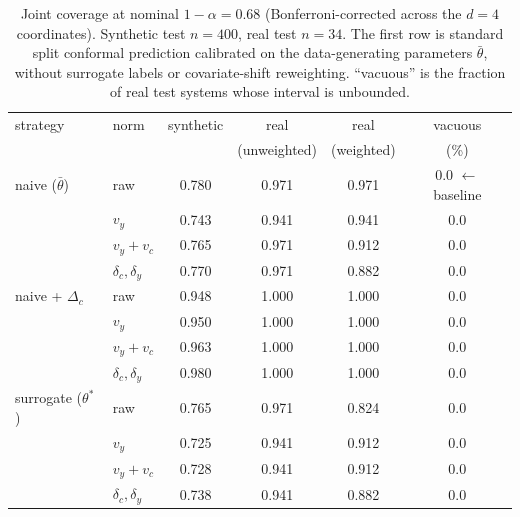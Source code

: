 \begin{table}[t]
\centering
\small
\begin{tabular}{llcccc}
\toprule
strategy & norm & synthetic & real & real & vacuous \\
         &      &           & (unweighted) & (weighted) & (\%) \\
\midrule
naive ($\bar\theta$) & raw & 0.780 & 0.971 & 0.971 & 0.0  \quad$\leftarrow$ baseline \\
 & $v_y$ & 0.743 & 0.941 & 0.941 & 0.0 \\
 & $v_y + v_c$ & 0.765 & 0.971 & 0.912 & 0.0 \\
 & $\delta_c,\delta_y$ & 0.770 & 0.971 & 0.882 & 0.0 \\
\midrule
naive + $\Delta_c$ & raw & 0.948 & 1.000 & 1.000 & 0.0 \\
 & $v_y$ & 0.950 & 1.000 & 1.000 & 0.0 \\
 & $v_y + v_c$ & 0.963 & 1.000 & 1.000 & 0.0 \\
 & $\delta_c,\delta_y$ & 0.980 & 1.000 & 1.000 & 0.0 \\
\midrule
surrogate ($\theta^*$) & raw & 0.765 & 0.971 & 0.824 & 0.0 \\
 & $v_y$ & 0.725 & 0.941 & 0.912 & 0.0 \\
 & $v_y + v_c$ & 0.728 & 0.941 & 0.912 & 0.0 \\
 & $\delta_c,\delta_y$ & 0.738 & 0.941 & 0.882 & 0.0 \\
\bottomrule
\end{tabular}
\caption{Joint coverage at nominal $1-\alpha = 0.68$ (Bonferroni-corrected across the $d=4$ coordinates). Synthetic test $n=400$, real test $n=34$. The first row is standard split conformal prediction calibrated on the data-generating parameters $\bar\theta$, without surrogate labels or covariate-shift reweighting. ``vacuous'' is the fraction of real test systems whose interval is unbounded.}
\label{tab:cp-ablation}
\end{table}
